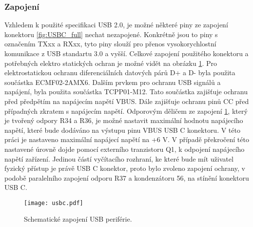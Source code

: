 	\subsubsection{Zapojení}
	Vzhledem k použité specifikaci USB 2.0, je možné některé piny ze zapojení konektoru \ref{fig:USBC_full} nechat nezapojené. Konkrétně jsou to piny s označením TXxx a RXxx, tyto piny slouží pro přenos vysokorychlostní komunikace z USB standartu 3.0 a vyšší. Celkové zapojení použitého konektoru a potřebných elektro statických ochran je možné vidět na obrázku \ref{fig:USBC_zapojeni}. Pro elektrostatickou ochranu diferenciálních datových párů D+ a D- byla použita součástka ECMF02-2AMX6. Dalším prvkem pro ochranu USB signálů a napájení, byla použita součástka TCPP01-M12. Tato součástka zajišťuje ochranu před předpětím na napájecím napětí VBUS. Dále zajišťuje ochranu pinů CC před případných zkratem s napájecím napětí. Odporovým děličem ze zapojení \ref{fig:USBC_zapojeni}, který je tvořený odpory R34 a R36, je možné nastavit maximální hodnotu napájecího napětí, které bude dodáváno na výstupu pinu VBUS USB C konektoru. V této práci je nastaveno maximální napájecí napětí na +6 V. V případě překročení této nastavené úrovně dojde pomocí externího tranzistoru Q1, k odpojení napájecího napětí zařízení. Jedinou částí vyčítacího rozhraní, ke které bude mít uživatel fyzický přístup je právě USB C konektor, proto bylo zvoleno zapojení ochrany, v podobě paralelního zapojení odporu R37 a kondenzátoru 56, na stínění konektoru USB C. 
	\begin{figure}[h!]
		\centering
		\captionsetup{justification=centering}
		\texttt{[image: usbc.pdf]}
		\caption{Schematické zapojení USB periférie.} 
		\label{fig:USBC_zapojeni}
	\end{figure} 
	
